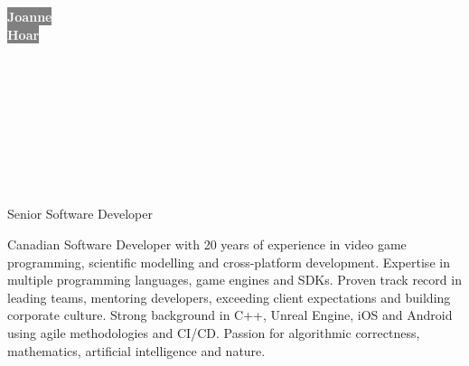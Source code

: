 \documentclass[9pt]{developercv}
\begin{document}
\begin{minipage}[t]{0.45\textwidth}
\colorbox{gray}{\HUGE\textcolor{white}{\textbf{Joanne}}} \\
\colorbox{gray}{\HUGE\textcolor{white}{\textbf{Hoar}}}
\end{minipage}
\begin{minipage}[t]{0.275\textwidth}
\\
\\
\\
\end{minipage}
\begin{minipage}[t]{0.275\textwidth}
\\
\\
\\
\\
\end{minipage}

{\huge Senior Software Developer}

Canadian Software Developer with 20 years of experience in video game programming, scientific modelling and cross-platform development. Expertise in multiple programming languages, game engines and SDKs. Proven track record in leading teams, mentoring developers, exceeding client expectations and building corporate culture. Strong background in C++, Unreal Engine, iOS and Android using agile methodologies and CI/CD. Passion for algorithmic correctness, mathematics, artificial intelligence and nature.
\end{document}
